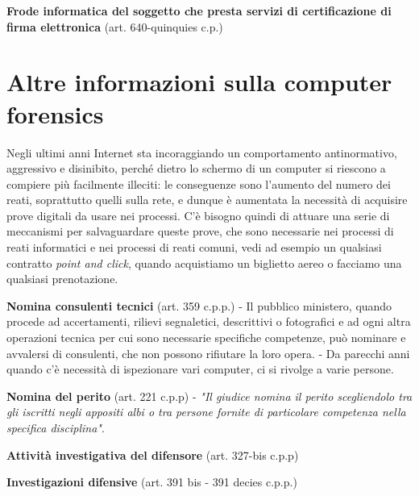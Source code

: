\vspace{5mm}

\textbf{Frode informatica del soggetto che presta servizi di certificazione di firma elettronica} (art. 640-quinquies c.p.)

\vspace{5mm}

\section{Altre informazioni sulla computer forensics}
Negli ultimi anni Internet sta incoraggiando un comportamento antinormativo, aggressivo e disinibito, perché dietro lo schermo di un computer si riescono a compiere più facilmente illeciti: le conseguenze sono l'aumento del numero dei reati, soprattutto quelli sulla rete, e dunque è aumentata la necessità di acquisire prove digitali da usare nei processi. C'è bisogno quindi di attuare una serie di meccanismi per salvaguardare queste prove, che sono necessarie nei processi di reati informatici e nei processi di reati comuni, vedi ad esempio un qualsiasi contratto \textit{point and click}, quando acquistiamo un biglietto aereo o facciamo una qualsiasi prenotazione.

\vspace{5mm}

\textbf{Nomina consulenti tecnici} (art. 359 c.p.p.) - Il pubblico ministero, quando procede ad accertamenti, rilievi segnaletici, descrittivi o fotografici e ad ogni altra operazioni tecnica per cui sono necessarie specifiche competenze, può nominare e avvalersi di consulenti, che non possono rifiutare la loro opera. - Da parecchi anni quando c'è necessità di ispezionare vari computer, ci si rivolge a varie persone.

\vspace{5mm}

\textbf{Nomina del perito} (art. 221 c.p.p) - \textit{"Il giudice nomina il perito scegliendolo tra gli iscritti negli appositi albi o tra persone fornite di particolare competenza nella specifica disciplina"}.

\vspace{5mm}

\textbf{Attività investigativa del difensore} (art. 327-bis c.p.p)

\vspace{5mm}

\textbf{Investigazioni difensive} (art. 391 bis - 391 decies c.p.p.)
